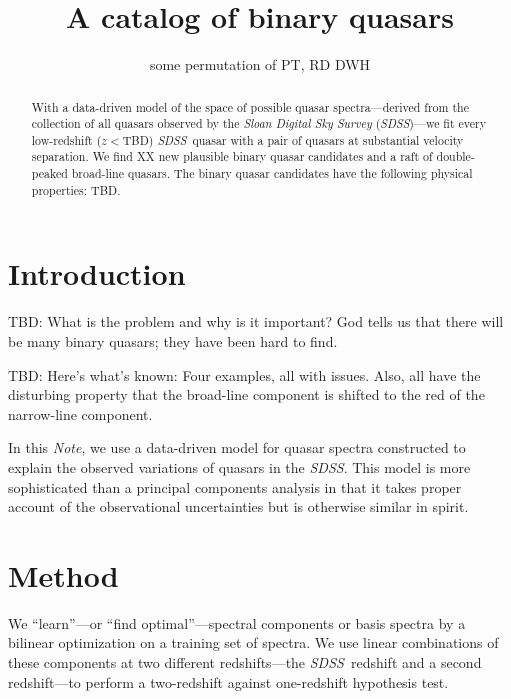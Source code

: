 \documentclass[preprint]{aastex}
\newcounter{address}
\newcommand{\project}[1]{\textsl{#1}}
\newcommand{\SDSS}{\project{SDSS}}
\newcommand{\documentname}{\textsl{Note}}
\begin{document}
\title{A catalog of binary quasars}
\author{some permutation of PT\altaffilmark{\ref{MPIA}},
        RD\altaffilmark{\ref{MPIA}}
        DWH\altaffilmark{\ref{MPIA},\ref{CCPP}}}
\setcounter{address}{1}

\begin{abstract}
  With a data-driven model of the space of possible quasar
  spectra---derived from the collection of all quasars observed by the
  \project{Sloan Digital Sky Survey} (\SDSS)---we fit every
  low-redshift ($z<$TBD) \SDSS\ quasar with a pair of quasars at
  substantial velocity separation.  We find XX new plausible binary
  quasar candidates and a raft of double-peaked broad-line quasars.
  The binary quasar candidates have the following physical properties:
  TBD.
\end{abstract}

\section{Introduction}

TBD: What is the problem and why is it important?  God tells us that
there will be many binary quasars; they have been hard to find.

TBD: Here's what's known: Four examples, all with issues.  Also, all
have the disturbing property that the broad-line component is shifted
to the red of the narrow-line component.

In this \documentname, we use a data-driven model for quasar spectra
constructed to explain the observed variations of quasars in the
\SDSS.  This model is more sophisticated than a principal components
analysis in that it takes proper account of the observational
uncertainties but is otherwise similar in spirit.

\section{Method}

We ``learn''---or ``find optimal''---spectral components or basis
spectra by a bilinear optimization on a training set of spectra.  We
use linear combinations of these components at two different
redshifts---the \SDSS\ redshift and a second redshift---to perform a
two-redshift against one-redshift hypothesis test.
\end{document}
